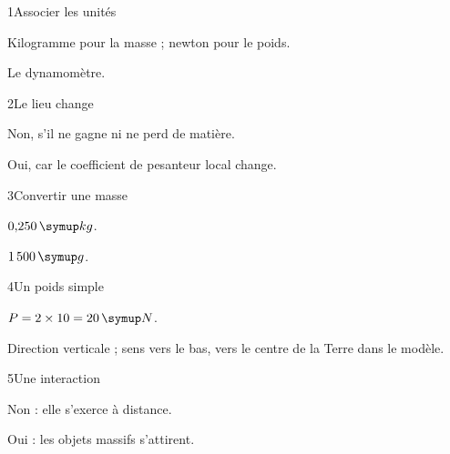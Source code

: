 \par\noindent\begin{minipage}{\linewidth}
\begin{corrige}{1}{Associer les unités}
\begin{questions}
\item Kilogramme pour la masse ; newton pour le poids.
\item Le dynamomètre.
\end{questions}
\end{corrige}
\end{minipage}
\par\noindent\begin{minipage}{\linewidth}
\begin{corrige}{2}{Le lieu change}
\begin{questions}
\item Non, s’il ne gagne ni ne perd de matière.
\item Oui, car le coefficient de pesanteur local change.
\end{questions}
\end{corrige}
\end{minipage}
\par\noindent\begin{minipage}{\linewidth}
\begin{corrige}{3}{Convertir une masse}
\begin{questions}
\item $0{,}250\unite{kg}$.
\item $1\,500\unite g$.
\end{questions}
\end{corrige}
\end{minipage}
\par\noindent\begin{minipage}{\linewidth}
\begin{corrige}{4}{Un poids simple}
\begin{questions}
\item $P=2\times10=20\unite N$.
\item Direction verticale ; sens vers le bas, vers le centre de la Terre dans le modèle.
\end{questions}
\end{corrige}
\end{minipage}
\par\noindent\begin{minipage}{\linewidth}
\begin{corrige}{5}{Une interaction}
\begin{questions}
\item Non : elle s’exerce à distance.
\item Oui : les objets massifs s’attirent.
\end{questions}
\end{corrige}
\end{minipage}
